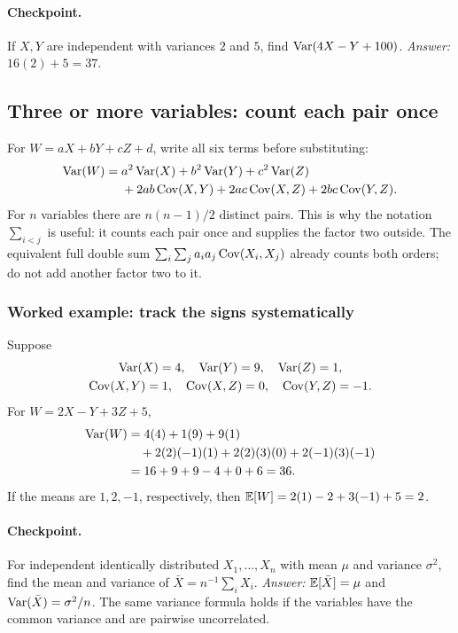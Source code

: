 \paragraph{Checkpoint.} If $X,Y$ are independent with variances $2$ and $5$, find $\operatorname{Var}(4X-Y+100)$. \emph{Answer:} $16(2)+5=37$.

\subsection{Three or more variables: count each pair once}
For $W=aX+bY+cZ+d$, write all six terms before substituting:
\[
\begin{aligned}
\operatorname{Var}(W)={}&a^2\operatorname{Var}(X)+b^2\operatorname{Var}(Y)+c^2\operatorname{Var}(Z)\\
&+2ab\operatorname{Cov}(X,Y)+2ac\operatorname{Cov}(X,Z)+2bc\operatorname{Cov}(Y,Z).
\end{aligned}
\]
For $n$ variables there are $n(n-1)/2$ distinct pairs. This is why the notation $\sum_{i<j}$ is useful: it counts each pair once and supplies the factor two outside. The equivalent full double sum
$\sum_i\sum_j a_i a_j\operatorname{Cov}(X_i,X_j)$ already counts both orders; do not add another factor two to it.

\subsubsection*{Worked example: track the signs systematically}
Suppose
\[
\begin{gathered}
 \operatorname{Var}(X)=4,\quad\operatorname{Var}(Y)=9,\quad\operatorname{Var}(Z)=1,\\
 \operatorname{Cov}(X,Y)=1,\quad\operatorname{Cov}(X,Z)=0,\quad\operatorname{Cov}(Y,Z)=-1.
\end{gathered}
\]
For $W=2X-Y+3Z+5$,
\[
\begin{aligned}
\operatorname{Var}(W)
&=4(4)+1(9)+9(1)\\
&\quad+2(2)(-1)(1)+2(2)(3)(0)+2(-1)(3)(-1)\\
&=16+9+9-4+0+6=36.
\end{aligned}
\]
If the means are $1,2,-1$, respectively, then $\mathbb E[W]=2(1)-2+3(-1)+5=2$.

\paragraph{Checkpoint.} For independent identically distributed $X_1,\ldots,X_n$ with mean $\mu$ and variance $\sigma^2$, find the mean and variance of $\bar X=n^{-1}\sum_iX_i$. \emph{Answer:} $\mathbb E[\bar X]=\mu$ and $\operatorname{Var}(\bar X)=\sigma^2/n$. The same variance formula holds if the variables have the common variance and are pairwise uncorrelated.

